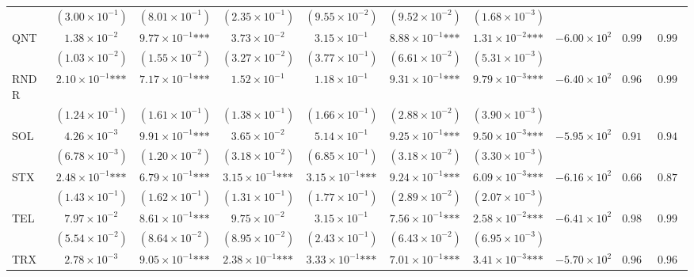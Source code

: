 \documentclass{article}
\begin{document}
\begin{landscape}
\begin{longtable}{lccccccccc}
 & $(3.00\times 10^{-1})$ & $(8.01\times 10^{-1})$ & $(2.35\times 10^{-1})$ & $(9.55\times 10^{-2})$ & $(9.52\times 10^{-2})$ & $(1.68\times 10^{-3})$ &  &  &  \\
QNT & $1.38\times 10^{-2}$ & $9.77\times 10^{-1}\text{***}$ & $3.73\times 10^{-2}$ & $3.15\times 10^{-1}$ & $8.88\times 10^{-1}\text{***}$ & $1.31\times 10^{-2}\text{***}$ & $-6.00\times 10^{2}$ & $0.992$ & $0.994$ \\
 & $(1.03\times 10^{-2})$ & $(1.55\times 10^{-2})$ & $(3.27\times 10^{-2})$ & $(3.77\times 10^{-1})$ & $(6.61\times 10^{-2})$ & $(5.31\times 10^{-3})$ &  &  &  \\
RNDR & $2.10\times 10^{-1}\text{***}$ & $7.17\times 10^{-1}\text{***}$ & $1.52\times 10^{-1}$ & $1.18\times 10^{-1}$ & $9.31\times 10^{-1}\text{***}$ & $9.79\times 10^{-3}\text{***}$ & $-6.40\times 10^{2}$ & $0.964$ & $0.990$ \\
 & $(1.24\times 10^{-1})$ & $(1.61\times 10^{-1})$ & $(1.38\times 10^{-1})$ & $(1.66\times 10^{-1})$ & $(2.88\times 10^{-2})$ & $(3.90\times 10^{-3})$ &  &  &  \\
SOL & $4.26\times 10^{-3}$ & $9.91\times 10^{-1}\text{***}$ & $3.65\times 10^{-2}$ & $5.14\times 10^{-1}$ & $9.25\times 10^{-1}\text{***}$ & $9.50\times 10^{-3}\text{***}$ & $-5.95\times 10^{2}$ & $0.918$ & $0.947$ \\
 & $(6.78\times 10^{-3})$ & $(1.20\times 10^{-2})$ & $(3.18\times 10^{-2})$ & $(6.85\times 10^{-1})$ & $(3.18\times 10^{-2})$ & $(3.30\times 10^{-3})$ &  &  &  \\
STX & $2.48\times 10^{-1}\text{***}$ & $6.79\times 10^{-1}\text{***}$ & $3.15\times 10^{-1}\text{***}$ & $3.15\times 10^{-1}\text{***}$ & $9.24\times 10^{-1}\text{***}$ & $6.09\times 10^{-3}\text{***}$ & $-6.16\times 10^{2}$ & $0.667$ & $0.877$ \\
 & $(1.43\times 10^{-1})$ & $(1.62\times 10^{-1})$ & $(1.31\times 10^{-1})$ & $(1.77\times 10^{-1})$ & $(2.89\times 10^{-2})$ & $(2.07\times 10^{-3})$ &  &  &  \\
TEL & $7.97\times 10^{-2}$ & $8.61\times 10^{-1}\text{***}$ & $9.75\times 10^{-2}$ & $3.15\times 10^{-1}$ & $7.56\times 10^{-1}\text{***}$ & $2.58\times 10^{-2}\text{***}$ & $-6.41\times 10^{2}$ & $0.989$ & $0.994$ \\
 & $(5.54\times 10^{-2})$ & $(8.64\times 10^{-2})$ & $(8.95\times 10^{-2})$ & $(2.43\times 10^{-1})$ & $(6.43\times 10^{-2})$ & $(6.95\times 10^{-3})$ &  &  &  \\
TRX & $2.78\times 10^{-3}$ & $9.05\times 10^{-1}\text{***}$ & $2.38\times 10^{-1}\text{***}$ & $3.33\times 10^{-1}\text{***}$ & $7.01\times 10^{-1}\text{***}$ & $3.41\times 10^{-3}\text{***}$ & $-5.70\times 10^{2}$ & $0.962$ & $0.968$ \\

\end{longtable}
\end{landscape}
\end{document}
